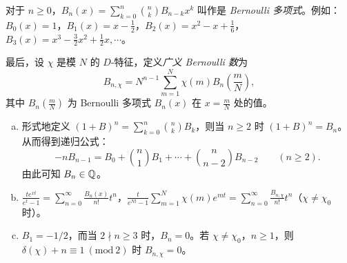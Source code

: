 对于 $n\geqslant 0$，$B_n(x)=\sum_{k=0}^{n}\binom{n}{k}B_{n-k}x^k$ 叫作是 \emph{Bernoulli 多项式}。例如：$B_0(x)=1$，$B_1(x)=x-\frac{1}{2}$，$B_2(x)=x^2-x+\frac{1}{6}$，$B_3(x)=x^3-\frac{3}{2}x^2+\frac{1}{2}x,\cdots$。

最后，设 $\chi$ 是模 $N$ 的 $D$-特征，定义\emph{广义 Bernoulli 数}为
\[
  B_{n,\chi}=N^{n-1}\sum_{m=1}^{N}\chi(m)B_n\left(\frac{m}{N}\right),
\]
其中 $B_n\left(\frac{m}{N}\right)$ 为 Bernoulli 多项式 $B_n(x)$ 在 $x=\frac{m}{N}$ 处的值。

\begin{theorem}\label{thm:4.10}
\begin{enumerate}[(a)]
  \item 形式地定义 $(1+B)^n=\sum_{k=0}^{n}\binom{n}{k}B_k$，则当 $n\geqslant 2$ 时 $(1+B)^n=B_n$。从而得到递归公式：
  \[
    -nB_{n-1}=B_0+\binom{n}{1}B_1+\cdots+\binom{n}{n-2}B_{n-2}\qquad(n\geqslant 2).
  \]
  由此可知 $B_n\in\mathbb{Q}$。
  \item $\frac{te^{xt}}{e^t-1}=\sum_{n=0}^{\infty}\frac{B_n(x)}{n!}t^n$，$\frac{t}{e^{Nt}-1}\sum_{m=1}^{N}\chi(m)e^{mt}=\sum_{n=0}^{\infty}\frac{B_{n,\chi}}{n!}t^n$（$\chi\neq\chi_0$ 时）。
  \item $B_1=-1/2$，而当 $2\nmid n\geqslant 3$ 时，$B_n=0$。若 $\chi\neq\chi_0$，$n\geqslant 1$，则 $\delta(\chi)+n\equiv 1\ (\mathrm{mod}\ 2)$ 时 $B_{n,\chi}=0$。
\end{enumerate}
\end{theorem}

